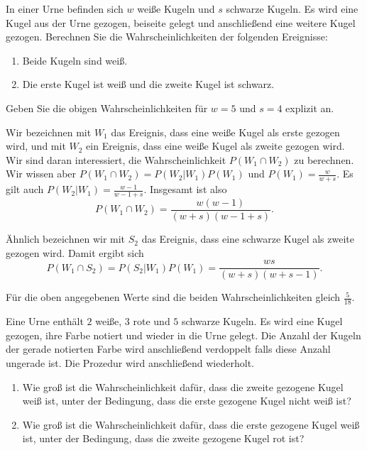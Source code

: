  In einer Urne
befinden sich $w$ weiße Kugeln und $s$ schwarze Kugeln. Es wird eine Kugel aus
der Urne gezogen, beiseite gelegt und anschließend eine weitere Kugel gezogen.
Berechnen Sie die Wahrscheinlichkeiten der folgenden Ereignisse:
\begin{enumerate}
    \item Beide Kugeln sind weiß.
    \item Die erste Kugel ist weiß und die zweite Kugel ist schwarz.
\end{enumerate}
Geben Sie die obigen Wahrscheinlichkeiten für $w=5$ und $s=4$ explizit an.

\solution Wir bezeichnen mit $W_1$ das Ereignis, dass eine weiße Kugel als
erste gezogen wird, und mit $W_2$ ein Ereignis, dass eine weiße Kugel als zweite
gezogen wird. Wir sind daran interessiert, die Wahrscheinlichkeit $P(W_1 \cap W_2)$ zu
berechnen. Wir wissen aber $P(W_1 \cap W_2) = P(W_2 | W_1) P(W_1)$ und
$P(W_1) = \frac{w}{w+s}$. Es gilt auch $P(W_2 | W_1) = \frac{w-1}{w-1+s}$.
Insgesamt ist also \begin{equation*}
    P(W_1 \cap W_2) = \frac{w(w-1)}{(w+s)(w-1+s) }.
\end{equation*}

Ähnlich bezeichnen wir mit $S_2$ das Ereignis, dass eine schwarze Kugel als zweite
gezogen wird. Damit ergibt sich
\begin{equation*}
    P(W_1 \cap S_2)= P(S_2 | W_1) P(W_1) = \frac{ w s }{(w+s)(w+s-1)}.
\end{equation*}

Für die oben angegebenen Werte sind die beiden Wahrscheinlichkeiten gleich
$\frac{5}{18}$.

 Eine Urne enthält $2$ weiße, $3$ rote und
$5$ schwarze Kugeln. Es wird eine Kugel gezogen, ihre Farbe notiert und wieder
in die Urne gelegt. Die Anzahl der Kugeln der gerade notierten Farbe wird
anschließend verdoppelt falls diese Anzahl ungerade ist. Die Prozedur wird
anschließend wiederholt.
\begin{enumerate}
    \item Wie groß ist die Wahrscheinlichkeit dafür, dass die zweite gezogene
        Kugel weiß ist, unter der Bedingung, dass die erste gezogene Kugel
        nicht weiß ist?

    \item Wie groß ist die Wahrscheinlichkeit dafür, dass die erste gezogene Kugel
        weiß ist, unter der Bedingung, dass die zweite gezogene Kugel rot ist?
\end{enumerate}

